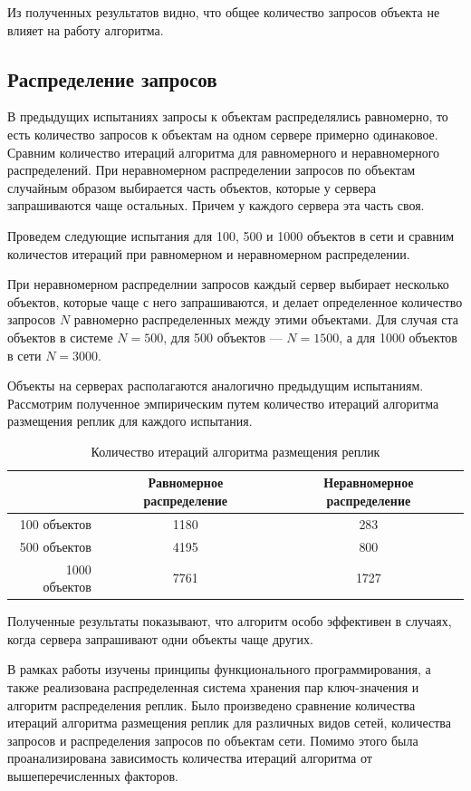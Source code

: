 			Из полученных результатов видно, что общее количество запросов объекта не влияет на работу алгоритма.

		\subsection{Распределение запросов}
			В предыдущих испытаниях запросы к объектам распределялись равномерно, то есть количество запросов к объектам на одном сервере примерно одинаковое. Сравним количество итераций 
			алгоритма для равномерного и неравномерного распределений. При неравномерном распределении запросов по объектам случайным образом выбирается часть объектов, которые у сервера 
			запрашиваются чаще остальных. Причем у каждого сервера эта часть своя.

			Проведем следующие испытания для 100, 500 и 1000 объектов в сети и сравним количестов итераций при равномерном и неравномерном распределении.

			При неравномерном распределнии запросов каждый сервер выбирает несколько объектов, которые чаще с него запрашиваются, и делает определенное количество запросов $N$ равномерно 
			распределенных между этими объектами. Для случая ста объектов в системе $N = 500$, для 500 объектов --- $N = 1500$, а для 1000 объектов в сети $N = 3000$.

			Объекты на серверах располагаются аналогично предыдущим испытаниям. Рассмотрим полученное эмпирическим путем количество итераций алгоритма размещения реплик для каждого испытания.

			\begin{table}[H]
				\small
				\centering
				\caption{Количество итераций алгоритма размещения реплик}
				\begin{tabular} {|r|c|c|}
					\hline
						& Равномерное распределение & Неравномерное распределение 	\\
					\hline
	100 объектов		& 1180						& 283 							\\
	500 объектов		& 4195						& 800 							\\
	1000 объектов		& 7761						& 1727 							\\
					\hline
				\end{tabular}
			\end{table}
	
			Полученные результаты показывают, что алгоритм особо эффективен в случаях, когда сервера запрашивают одни объекты чаще других.
\newpage		
		
\Conc

	В рамках работы изучены принципы функционального программирования, а также реализована распределенная система хранения пар ключ-значения и алгоритм распределения реплик.
	Было произведено сравнение количества итераций алгоритма размещения реплик для различных видов сетей, количества запросов и распределения запросов по объектам сети.
	Помимо этого была проанализирована зависимость количества итераций алгоритма от вышеперечисленных факторов.
\newpage

\printbibliography[%
    heading=bibintoc%
]


